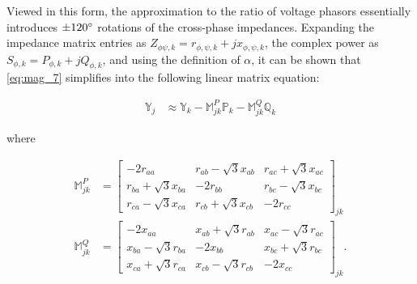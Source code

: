 Viewed in this form, the approximation to the ratio of voltage phasors essentially introduces $\pm 120 \degree$ rotations of the cross-phase impedances. Expanding the impedance matrix entries as $Z_{\phi \psi,k} = r_{\phi, \psi,k} + j x_{\phi, \psi,k}$, the complex power as $S_{\phi,k} = P_{\phi,k} + j Q_{\phi,k}$, and using the definition of $\alpha$, it can be shown that \eqref{eq:mag_7} simplifies into the following linear matrix equation:

\begin{align}
	\mathbb{Y}_{j} &\approx \mathbb{Y}_{k} - \mathbb{M}_{jk}^{P} \mathbb{P}_{k} - \mathbb{M}_{jk}^{Q} \mathbb{Q}_{k} \label{eq:mag_8}
\end{align}

\noindent where


\begin{align}
	\mathbb{M}_{jk}^{P} &=
	\begin{bmatrix}
		-2 r_{aa} & r_{ab} - \sqrt{3} x_{ab} & r_{ac} + \sqrt{3} x_{ac} \\
		r_{ba} + \sqrt{3} x_{ba} & -2 r_{bb} & r_{bc} - \sqrt{3} x_{bc} \\
		r_{ca} - \sqrt{3} x_{ca} & r_{cb} + \sqrt{3} x_{cb} & -2 r_{cc}
	\end{bmatrix}_{jk} \label{eq:M}\\
	\mathbb{M}_{jk}^{Q} &=
	\begin{bmatrix}
		-2 x_{aa} & x_{ab} + \sqrt{3} r_{ab} & x_{ac} - \sqrt{3} r_{ac} \\
		x_{ba} -\sqrt{3} r_{ba} & -2 x_{bb} & x_{bc} + \sqrt{3} r_{bc}\\
		x_{ca} + \sqrt{3} r_{ca} & x_{cb} -\sqrt{3} r_{cb} & -2 x_{cc}
	\end{bmatrix}_{jk} \label{eq:N}.
\end{align}

